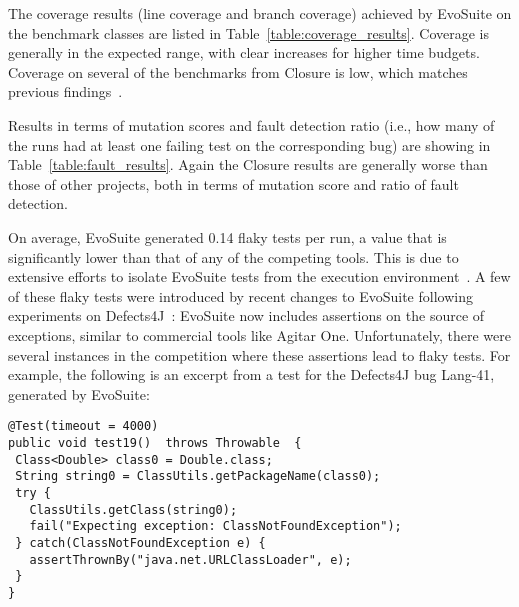 \documentclass{sig-alternate}
\newcommand{\EVOSUITE}{{\sc EvoSuite}\xspace}
\begin{document}
\begin{table*}[t]
  \centering
  \caption{\label{table:coverage_results}Detailed coverage results of \EVOSUITE on the SBST benchmark classes.}
\resizebox{0.8\textwidth}{!}{  

}
\end{table*}

\begin{table*}[t]
  \centering
  \caption{\label{table:fault_results}Detailed fault detection results of \EVOSUITE on the SBST benchmark classes.}
\resizebox{0.8\textwidth}{!}{  

}	
\end{table*}



The coverage results (line coverage and branch coverage) achieved by
\EVOSUITE on the benchmark classes are listed in
Table~\ref{table:coverage_results}. Coverage is generally in the
expected range, with clear increases for higher time budgets. Coverage
on several of the benchmarks from Closure is low, which matches
previous findings~\cite{shamshiri2015automatically}. 

Results in terms of mutation scores and fault detection ratio (i.e.,
how many of the runs had at least one failing test on the
corresponding bug) are showing in
Table~\ref{table:fault_results}. Again the Closure results are
generally worse than those of other projects, both in terms of
mutation score and ratio of fault detection.

On average, \EVOSUITE generated 0.14 flaky tests per run, a value that
is significantly lower than that of any of the competing tools. This
is due to extensive efforts to isolate \EVOSUITE tests from the
execution environment~\cite{arcuri2014automated}. A few of these flaky
tests were introduced by recent changes to \EVOSUITE following
experiments on Defects4J~\cite{shamshiri2015automatically}: \EVOSUITE
now includes assertions on the source of exceptions, similar to
commercial tools like Agitar One. %
Unfortunately, there were several instances in the competition where these assertions
lead to flaky tests. For example, the following is an excerpt from a
test for the Defects4J bug Lang-41, generated by \EVOSUITE:
\vspace{1em}

\begin{lstlisting}
@Test(timeout = 4000)
public void test19()  throws Throwable  {
 Class<Double> class0 = Double.class;
 String string0 = ClassUtils.getPackageName(class0);
 try { 
   ClassUtils.getClass(string0);
   fail("Expecting exception: ClassNotFoundException"); 
 } catch(ClassNotFoundException e) {
   assertThrownBy("java.net.URLClassLoader", e);
 }
}
\end{lstlisting}
\end{document}

